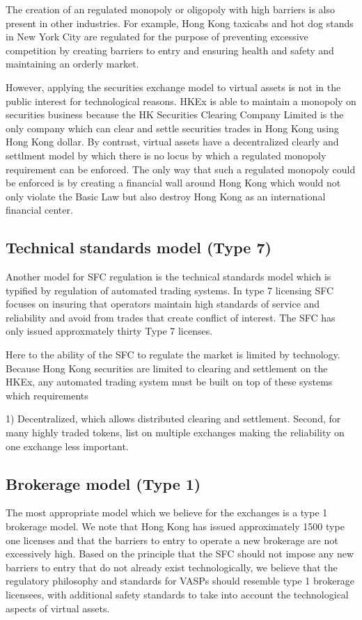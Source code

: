 The creation of an regulated monopoly or oligopoly with high barriers
is also present in other industries.  For example, Hong Kong taxicabs
and hot dog stands in New York City are regulated for the purpose of
preventing excessive competition by creating barriers to entry and
ensuring health and safety and maintaining an orderly market.

However, applying the securities exchange model to virtual assets is
not in the public interest for technological reasons.  HKEx is able to
maintain a monopoly on securities business because the HK Securities
Clearing Company Limited is the only company which can clear and
settle securities trades in Hong Kong using Hong Kong dollar.  By
contrast, virtual assets have a decentralized clearly and settlment
model by which there is no locus by which a regulated monopoly
requirement can be enforced.  The only way that such a regulated
monopoly could be enforced is by creating a financial wall around Hong
Kong which would not only violate the Basic Law but also destroy Hong
Kong as an international financial center.

\subsection{Technical standards model (Type 7)}

Another model for SFC regulation is the technical standards model
which is typified by regulation of automated trading systems.  In type
7 licensing SFC focuses on insuring that operators maintain high
standards of service and reliability and avoid from trades that create
conflict of interest.  The SFC has only issued approxmately thirty
Type 7 licenses.

Here to the ability of the SFC to regulate the market is limited by
technology.  Because Hong Kong securities are limited to clearing and
settlement on the HKEx, any automated trading system must be built on
top of these systems which requirements

1) Decentralized, which allows distributed clearing and settlement.
Second, for many highly traded tokens, list on multiple exchanges
making the reliability on one exchange less important.

\subsection{Brokerage model (Type 1)}

The most appropriate model which we believe for the exchanges is a
type 1 brokerage model. We note that Hong Kong has issued
approximately 1500 type one licenses and that the barriers to entry to
operate a new brokerage are not excessively high.  Based on the
principle that the SFC should not impose any new barriers to entry
that do not already exist technologically, we believe that the
regulatory philosophy and standards for VASPs should resemble type 1
brokerage licensees, with additional safety standards to take into
account the technological aspects of virtual assets.

